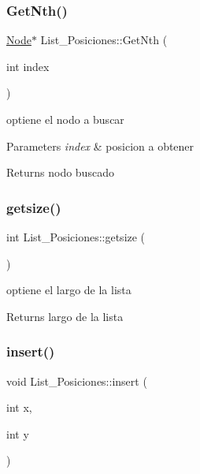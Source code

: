 \subsubsection{\texorpdfstring{Get\+Nth()}{GetNth()}}
{\footnotesize\ttfamily \hyperlink{classNode}{Node}$\ast$ List\+\_\+\+Posiciones\+::\+Get\+Nth (\begin{DoxyParamCaption}\item[{int}]{index }\end{DoxyParamCaption})\hspace{0.3cm}{\ttfamily [inline]}}



optiene el nodo a buscar 


\begin{DoxyParams}{Parameters}
{\em index} & posicion a obtener \\
\hline
\end{DoxyParams}
\begin{DoxyReturn}{Returns}
nodo buscado 
\end{DoxyReturn}
\mbox{\label{classList__Posiciones_ac21ed6aafc1319876f938ef0cf7a1b60}} 
\subsubsection{\texorpdfstring{getsize()}{getsize()}}
{\footnotesize\ttfamily int List\+\_\+\+Posiciones\+::getsize (\begin{DoxyParamCaption}{ }\end{DoxyParamCaption})\hspace{0.3cm}{\ttfamily [inline]}}



optiene el largo de la lista 

\begin{DoxyReturn}{Returns}
largo de la lista 
\end{DoxyReturn}
\mbox{\label{classList__Posiciones_a90096ef7143e1d44c48d589af6f1e94c}} 
\subsubsection{\texorpdfstring{insert()}{insert()}}
{\footnotesize\ttfamily void List\+\_\+\+Posiciones\+::insert (\begin{DoxyParamCaption}\item[{int}]{x,  }\item[{int}]{y }\end{DoxyParamCaption})\hspace{0.3cm}{\ttfamily [inline]}}



